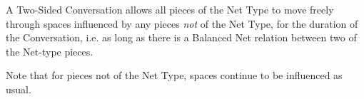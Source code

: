  A Two-Sided Conversation allows all pieces of the Net Type to move freely through
  spaces influenced by any pieces {\sl not} of the Net Type, for the duration of the
  Conversation, i.e. as long as there is a Balanced Net relation between two of the
  Net-type pieces.

  Note that for pieces not of the Net Type, spaces continue to be influenced as
  usual.

